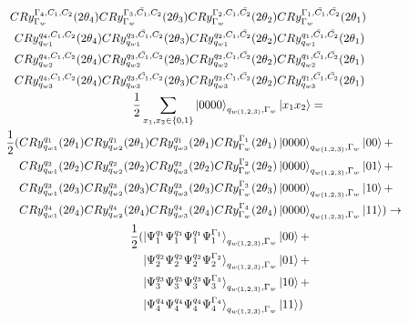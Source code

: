 \begin{equation}
   \resizebox{.9\hsize}{!}{$\begin{split}
        CRy_{\Gamma_w}^{\Gamma_4,C_1,C_2}(2\theta_4)CRy_{\Gamma_w}^{\Gamma_3,\bar{C_1},C_2}(2\theta_3)CRy_{\Gamma_w}^{\Gamma_2,C_1,\bar{C_2}}(2\theta_2)&CRy_{\Gamma_w}^{\Gamma_1,\bar{C_1},\bar{C_2}}(2\theta_1)\\
        CRy_{q_{w1}}^{q_4,C_1,C_2}(2\theta_4)CRy_{q_{w1}}^{q_3,\bar{C_1},C_2}(2\theta_3)CRy_{q_{w1}}^{q_2,C_1,\bar{C_2}}(2\theta_2)&CRy_{q_{w1}}^{q_1,\bar{C_1},\bar{C_2}}(2\theta_1)\\
        CRy_{q_{w2}}^{q_4,C_1,C_2}(2\theta_4)CRy_{q_{w2}}^{q_3,\bar{C_1},C_2}(2\theta_3)CRy_{q_{w2}}^{q_2,C_1,\bar{C_2}}(2\theta_2)&CRy_{q_{w2}}^{q_1,\bar{C_1},\bar{C_2}}(2\theta_1)\\
        CRy_{q_{w3}}^{q_4,C_1,C_2}(2\theta_4)CRy_{q_{w3}}^{q_3,\bar{C_1},C_2}(2\theta_3)CRy_{q_{w3}}^{q_2,C_1,\bar{C_2}}(2\theta_2)&CRy_{q_{w3}}^{q_1,\bar{C_1},\bar{C_2}}(2\theta_1)\\
        \frac{1}{2}\sum_{x_1,x_2\in\{0,1\}}\ket{0000}_{q_{w(1,2,3)},\Gamma_w}&\ket{ x_1x_2}=\\
        \frac{1}{2}(
        CRy_{q_{w1}}^{q_1}(2\theta_1)CRy_{q_{w2}}^{q_1}(2\theta_1)CRy_{q_{w3}}^{q_1}(2\theta_1) CRy_{\Gamma_w}^{\Gamma_1}(2\theta_1)&\ket{0000}_{q_{w(1,2,3)},\Gamma_w}\ket{ 00}+\\
        CRy_{q_{w1}}^{q_2}(2\theta_2)CRy_{q_{w2}}^{q_2}(2\theta_2)CRy_{q_{w3}}^{q_2}(2\theta_2) CRy_{\Gamma_w}^{\Gamma_2}(2\theta_2)&\ket{0000}_{q_{w(1,2,3)},\Gamma_w}\ket{ 01}+\\
        CRy_{q_{w1}}^{q_3}(2\theta_3)CRy_{q_{w2}}^{q_3}(2\theta_3)CRy_{q_{w3}}^{q_3}(2\theta_3) CRy_{\Gamma_w}^{\Gamma_3}(2\theta_3)&\ket{0000}_{q_{w(1,2,3)},\Gamma_w}\ket{ 10}+\\
        CRy_{q_{w1}}^{q_4}(2\theta_4)CRy_{q_{w2}}^{q_4}(2\theta_4)CRy_{q_{w3}}^{q_4}(2\theta_4) CRy_{\Gamma_w}^{\Gamma_4}(2\theta_4)&\ket{0000}_{q_{w(1,2,3)},\Gamma_w}\ket{ 11})\to\\
        \frac{1}{2}(
        \ket{\Psi^{q_1}_1\Psi^{q_1}_1\Psi^{q_1}_1\Psi^{\Gamma_1}_1}_{q_{w(1,2,3)},\Gamma_w}&\ket{ 00}+\\
        \ket{\Psi^{q_2}_2\Psi^{q_2}_2\Psi^{q_2}_2\Psi^{\Gamma_2}_2}_{q_{w(1,2,3)},\Gamma_w}&\ket{ 01}+\\
        \ket{\Psi^{q_3}_3\Psi^{q_3}_3\Psi^{q_3}_3\Psi^{\Gamma_3}_3}_{q_{w(1,2,3)},\Gamma_w}&\ket{ 10}+\\
        \ket{\Psi^{q_4}_4\Psi^{q_4}_4\Psi^{q_4}_4\Psi^{\Gamma_4}_4}_{q_{w(1,2,3)},\Gamma_w}&\ket{ 11}
        )
   \end{split}$}
\end{equation}
